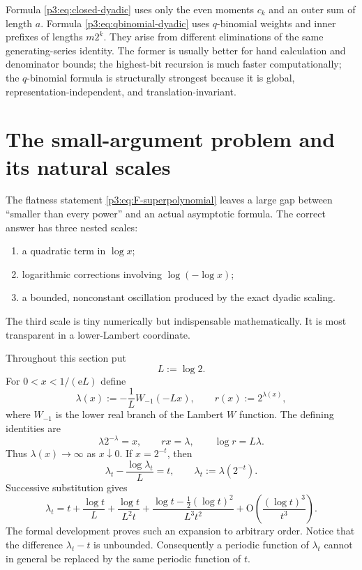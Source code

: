 \documentclass[11pt]{article}
\numberwithin{equation}{section}
\theoremstyle{definition}
\theoremstyle{remark}
\newcommand{\e}{\mathrm e}
\newcommand{\Oh}{\mathrm O}
\begin{document}
Formula \eqref{p3:eq:closed-dyadic} uses only the even moments $c_k$ and an outer sum of length $a$.  Formula \eqref{p3:eq:qbinomial-dyadic} uses $q$-binomial weights and inner prefixes of lengths $m2^k$.  They arise from different eliminations of the same generating-series identity.  The former is usually better for hand calculation and denominator bounds; the highest-bit recursion is much faster computationally; the $q$-binomial formula is structurally strongest because it is global, representation-independent, and translation-invariant.


\section{The small-argument problem and its natural scales}\label{p3:sec:asymptotic}

The flatness statement \eqref{p3:eq:F-superpolynomial} leaves a large gap between
``smaller than every power'' and an actual asymptotic formula.  The correct
answer has three nested scales:
\begin{enumerate}
\item a quadratic term in $\log x$;
\item logarithmic corrections involving $\log(-\log x)$;
\item a bounded, nonconstant oscillation produced by the exact dyadic scaling.
\end{enumerate}
The third scale is tiny numerically but indispensable mathematically.  It is
most transparent in a lower-Lambert coordinate.

Throughout this section put
\begin{equation}\label{p3:eq:L-def}
 L:=\log 2.
\end{equation}
For $0<x<1/(\e L)$ define
\begin{equation}\label{p3:eq:lambda-def}
 \lambda(x):=-\frac{1}{L}W_{-1}(-Lx),
 \qquad r(x):=2^{\lambda(x)},
\end{equation}
where $W_{-1}$ is the lower real branch of the Lambert $W$ function\cite{p3:CorlessLambertW}.  The
defining identities are
\begin{equation}\label{p3:eq:lambda-identities}
 \lambda 2^{-\lambda}=x,
 \qquad r x=\lambda,
 \qquad \log r=L\lambda.
\end{equation}
Thus $\lambda(x)\to\infty$ as $x\downarrow0$.  If $x=2^{-t}$, then
\begin{equation}\label{p3:eq:lambda-dyadic-fixed-point}
 \lambda_t-\frac{\log\lambda_t}{L}=t,
 \qquad \lambda_t:=\lambda(2^{-t}).
\end{equation}
Successive substitution gives
\begin{equation}\label{p3:eq:lambda-expansion}
 \lambda_t=t+\frac{\log t}{L}
 +\frac{\log t}{L^2t}
 +\frac{\log t-\tfrac12(\log t)^2}{L^3t^2}
 +\Oh\!\left(\frac{(\log t)^3}{t^3}\right).
\end{equation}
The formal development proves such an expansion to arbitrary order.  Notice
that the difference $\lambda_t-t$ is unbounded.  Consequently a periodic
function of $\lambda_t$ cannot in general be replaced by the same periodic
function of $t$.
\end{document}

